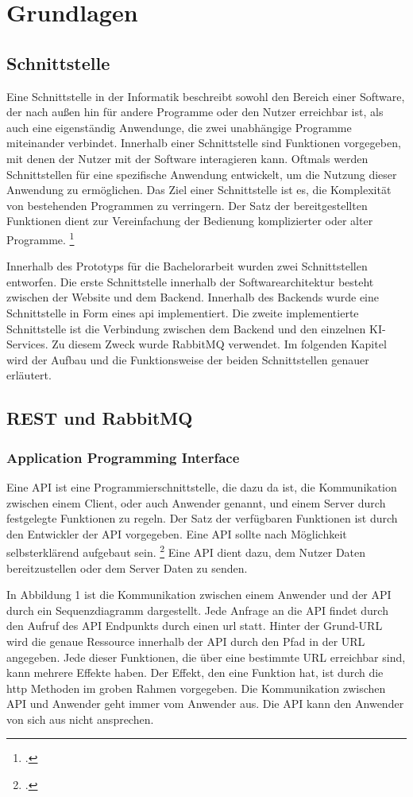 \section{Grundlagen}
\subsection{Schnittstelle}
Eine Schnittstelle in der Informatik beschreibt sowohl den Bereich einer Software, der nach außen hin für andere Programme oder den Nutzer erreichbar ist, als auch eine eigenständig Anwendunge, die zwei unabhängige Programme miteinander verbindet. Innerhalb einer Schnittstelle sind Funktionen vorgegeben, mit denen der Nutzer mit der Software interagieren kann. Oftmals werden Schnittstellen für eine spezifische Anwendung entwickelt, um die Nutzung dieser Anwendung zu ermöglichen. Das Ziel einer Schnittstelle ist es, die Komplexität von bestehenden Programmen zu verringern. Der Satz der bereitgestellten Funktionen dient zur Vereinfachung der Bedienung komplizierter oder alter Programme. 
\footcite{sneed2006integrating}

Innerhalb des Prototyps für die Bachelorarbeit wurden zwei Schnittstellen entworfen. Die erste Schnittstelle innerhalb der Softwarearchitektur besteht zwischen der Website und dem Backend. Innerhalb des Backends wurde eine Schnittstelle in Form eines \ac{api} implementiert. Die zweite implementierte Schnittstelle ist die Verbindung zwischen dem Backend und den einzelnen KI-Services. Zu diesem Zweck wurde RabbitMQ verwendet. Im folgenden Kapitel wird der Aufbau und die Funktionsweise der beiden Schnittstellen genauer erläutert.

\subsection{REST und RabbitMQ}
\subsubsection{Application Programming Interface}
Eine API ist eine Programmierschnittstelle, die dazu da ist, die Kommunikation zwischen einem Client, oder auch Anwender genannt, und einem Server durch festgelegte Funktionen zu regeln. Der Satz der verfügbaren Funktionen ist durch den Entwickler der API vorgegeben. Eine API sollte nach Möglichkeit selbsterklärend aufgebaut sein. \footcite{bloch2006design} Eine API dient dazu, dem Nutzer Daten bereitzustellen oder dem Server Daten zu senden.

In Abbildung 1 ist die Kommunikation zwischen einem Anwender und der API durch ein Sequenzdiagramm dargestellt. Jede Anfrage an die API findet durch den Aufruf des API Endpunkts durch einen \ac{url} statt. Hinter der Grund-URL wird die genaue Ressource innerhalb der API durch den Pfad in der URL angegeben. Jede dieser Funktionen, die über eine bestimmte URL erreichbar sind, kann mehrere Effekte haben. Der Effekt, den eine Funktion hat, ist durch die \ac{http} Methoden im groben Rahmen vorgegeben. Die Kommunikation zwischen API und Anwender geht immer vom Anwender aus. Die API kann den Anwender von sich aus nicht ansprechen. 

